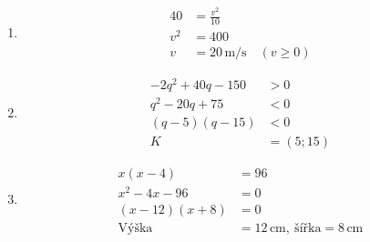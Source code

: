\documentclass[11pt,a4paper]{article}
\begin{document}
\begin{zadaniReseniBox}[title={Domácí úkol}]
\begin{enumerate}[label=\alph*),itemsep=2pt]
\[\begin{aligned}
-5t^2+20t+1&=16\\[2pt]
t^2-4t+3&=0\\[2pt]
(t-1)(t-3)&=0\\[2pt]
t&=1\,\mathrm s\ \text{nebo}\ 3\,\mathrm s
\end{aligned}\]
\item
\[\begin{aligned}
40&=\frac{v^2}{10}\\[2pt]
v^2&=400\\[2pt]
v&=20\,\mathrm{m/s}\quad(v\ge0)
\end{aligned}\]
\item
\[\begin{aligned}
-2q^2+40q-150&>0\\[2pt]
q^2-20q+75&<0\\[2pt]
(q-5)(q-15)&<0\\[2pt]
K&=(5;15)
\end{aligned}\]
\item
\[\begin{aligned}
x(x-4)&=96\\[2pt]
x^2-4x-96&=0\\[2pt]
(x-12)(x+8)&=0\\[2pt]
\text{Výška}&=12\,\mathrm{cm},\ \text{šířka}=8\,\mathrm{cm}
\end{aligned}\]
\end{enumerate}
\end{zadaniReseniBox}
\end{document}
